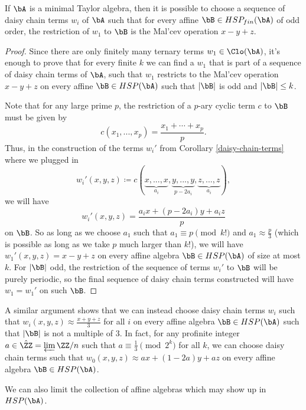 \begin{prop} If $\bA$ is a minimal Taylor algebra, then it is possible to choose a sequence of daisy chain terms $w_i$ of $\bA$ such that for every affine $\bB \in HSP_{fin}(\bA)$ of odd order, the restriction of $w_1$ to $\bB$ is the Mal'cev operation $x-y+z$.
\end{prop}
\begin{proof} Since there are only finitely many ternary terms $w_1 \in \Clo(\bA)$, it's enough to prove that for every finite $k$ we can find a $w_1$ that is part of a sequence of daisy chain terms of $\bA$, such that $w_1$ restricts to the Mal'cev operation $x-y+z$ on every affine $\bB \in HSP(\bA)$ such that $|\bB|$ is odd and $|\bB| \le k$.

Note that for any large prime $p$, the restriction of a $p$-ary cyclic term $c$ to $\bB$ must be given by
\[
c(x_1, ..., x_p) = \frac{x_1 + \cdots + x_p}{p}.
\]
Thus, in the construction of the terms $w_i'$ from Corollary \ref{daisy-chain-terms} where we plugged in
\[
w_i'(x,y,z) \coloneqq c(\underbrace{x,...,x}_{a_i}, \underbrace{y,...,y}_{p-2a_i}, \underbrace{z,...,z}_{a_i}),
\]
we will have
\[
w_i'(x,y,z) = \frac{a_ix + (p-2a_i)y + a_iz}{p}
\]
on $\bB$. So as long as we choose $a_1$ such that $a_1 \equiv p \pmod{k!}$ and $a_1 \approx \frac{p}{3}$ (which is possible as long as we take $p$ much larger than $k!$), we will have $w_1'(x,y,z) = x-y+z$ on every affine algebra $\bB \in HSP(\bA)$ of size at most $k$. For $|\bB|$ odd, the restriction of the sequence of terms $w_i'$ to $\bB$ will be purely periodic, so the final sequence of daisy chain terms constructed will have $w_1 = w_1'$ on such $\bB$.
\end{proof}

\begin{rem} A similar argument shows that we can instead choose daisy chain terms $w_i$ such that $w_i(x,y,z) \approx \frac{x+y+z}{3}$ for all $i$ on every affine algebra $\bB \in HSP(\bA)$ such that $|\bB|$ is not a multiple of $3$. In fact, for any profinite integer $a \in \hat{\ZZ} = \varprojlim \ZZ/n$ such that $a \equiv \frac{1}{3} \pmod{2^k}$ for all $k$, we can choose daisy chain terms such that $w_0(x,y,z) \approx ax + (1-2a)y + az$ on every affine algebra $\bB \in HSP(\bA)$.
\end{rem}

We can also limit the collection of affine algebras which may show up in $HSP(\bA)$.

